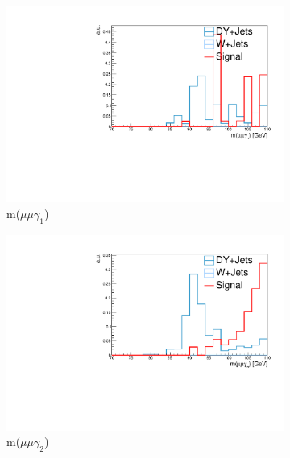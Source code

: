 \begin{figure}[htb!]
	\centering
	\captionsetup[subfigure]{justification=centering}
	\begin{subfigure}[h]{.32\linewidth}
		\centering
		\includegraphics[width=\linewidth]{figs/05_analysis/2018_ZX_Zg1_mass_MU_preFSR_mx20_comp.pdf}
		\caption{m($\mu\mu\gamma_1$)}
	\end{subfigure}
	\begin{subfigure}[h]{.32\linewidth}
		\centering
		\includegraphics[width=\linewidth]{figs/05_analysis/2018_ZX_Zg2_mass_MU_preFSR_mx20_comp.pdf}
		\caption{m($\mu\mu\gamma_2$)}
	\end{subfigure}
	\begin{subfigure}[h]{.32\linewidth}
		\centering

\end{subfigure}
\end{figure}
